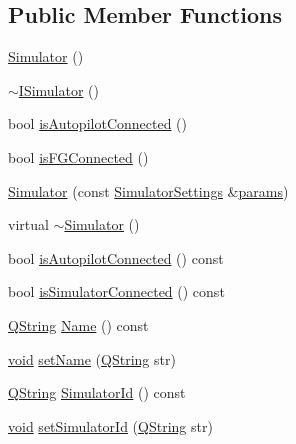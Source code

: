 \subsection*{Public Member Functions}
\begin{DoxyCompactItemize}
\item 
\hyperlink{class_simulator_a031573bfcfe2e0f5c9539bcc1c7fc5d9}{Simulator} ()
\item 
\hyperlink{class_simulator_a2961f34fd868d8f8f3eb71ab002df54f}{$\sim$\-I\-Simulator} ()
\item 
bool \hyperlink{class_simulator_a9a69b3d8f2f2e54d7e59f31afdccc9f1}{is\-Autopilot\-Connected} ()
\item 
bool \hyperlink{class_simulator_a11578ec4371c6833eee4e28684e874b5}{is\-F\-G\-Connected} ()
\item 
\hyperlink{group___h_i_t_l_plugin_ga8599e13b1f45081a08b7dd1f8c2a988b}{Simulator} (const \hyperlink{group___h_i_t_l_plugin_ga052199f1328d3002bce3e45345aa7f4e}{Simulator\-Settings} \&\hyperlink{glext_8h_afeb6390ab3bc8a0e96a88aff34d52288}{params})
\item 
virtual \hyperlink{group___h_i_t_l_plugin_ga0f49aa04f42060a785adf77346b9de9f}{$\sim$\-Simulator} ()
\item 
bool \hyperlink{group___h_i_t_l_plugin_gae38ae2b9870e2eb3888b406ef069b0ac}{is\-Autopilot\-Connected} () const 
\item 
bool \hyperlink{group___h_i_t_l_plugin_ga4736ea66352f66d9977879364f3c3c0a}{is\-Simulator\-Connected} () const 
\item 
\hyperlink{group___u_a_v_objects_plugin_gab9d252f49c333c94a72f97ce3105a32d}{Q\-String} \hyperlink{group___h_i_t_l_plugin_ga40c6b40efb10e456ccedfdcd88d5988d}{Name} () const 
\item 
\hyperlink{group___u_a_v_objects_plugin_ga444cf2ff3f0ecbe028adce838d373f5c}{void} \hyperlink{group___h_i_t_l_plugin_ga11bc3ca9ef98431bcb82d8b72ad127b8}{set\-Name} (\hyperlink{group___u_a_v_objects_plugin_gab9d252f49c333c94a72f97ce3105a32d}{Q\-String} str)
\item 
\hyperlink{group___u_a_v_objects_plugin_gab9d252f49c333c94a72f97ce3105a32d}{Q\-String} \hyperlink{group___h_i_t_l_plugin_gac518ebc236c9f36b629c1145408315aa}{Simulator\-Id} () const 
\item 
\hyperlink{group___u_a_v_objects_plugin_ga444cf2ff3f0ecbe028adce838d373f5c}{void} \hyperlink{group___h_i_t_l_plugin_ga7c1b69b9900d1cb7e5b849f98adf0f9c}{set\-Simulator\-Id} (\hyperlink{group___u_a_v_objects_plugin_gab9d252f49c333c94a72f97ce3105a32d}{Q\-String} str)

\end{DoxyCompactItemize}
